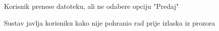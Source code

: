 \begin{packed_item}
\begin{packed_item}
\begin{packed_enum}
							\end{packed_enum}

							\item[5.a]  Korisnik prenese datoteku, ali ne odabere opciju "Predaj"
							\item[] \begin{packed_enum}
								
								\item Sustav javlja korisniku kako nije pohranio rad prije izlaska iz prozora
								
							\end{packed_enum}
							
						\end{packed_item}
					
					\end{packed_item}
					
